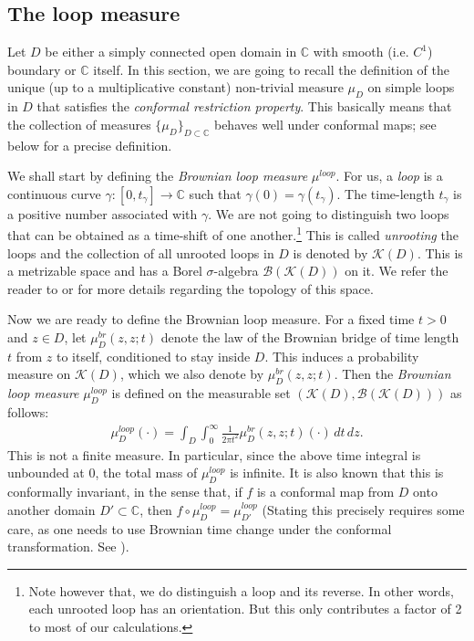 \documentclass[a4paper, 11pt, reqno]{amsart}
\theoremstyle{definition} \newtheorem{defn}{Definition}[section]
\theoremstyle{remark} \newtheorem{rem}[defn]{Remark}
\theoremstyle{remark} \newtheorem*{rem*}{Remark}
\theoremstyle{plain} \newtheorem{thm}[defn]{Theorem}
\theoremstyle{plain} \newtheorem{lem}[defn]{Lemma}
\theoremstyle{plain} \newtheorem{prop}[defn]{Proposition}
\theoremstyle{plain} \newtheorem{cor}[defn]{Corollary}
\theoremstyle{remark} \newtheorem{exm}[defn]{\textbf{Example}}
\theoremstyle{remark} \newtheorem{exms}[defn]{\textbf{Examples}}
\theoremstyle{remark} \newtheorem*{bl}{}
\numberwithin{equation}{section} %
\newcommand{\mc}{\mathcal}
\newcommand{\C}{\mathbb{C}}
\begin{document}
	\subsection{The loop measure}\label{sec:prelim_loop_measure}

    Let $D$ be either a simply connected open domain in $\C$ with smooth (i.e. $C^1$) boundary or $\C$ itself. In this section, we are going to recall the definition of the unique (up to a multiplicative constant) non-trivial measure $\mu_D$ on simple loops in $D$ that satisfies the \textit{conformal restriction property}. This basically means that the collection of measures $\{\mu_D\}_{D\subset \C}$ behaves well under conformal maps; see below for a precise definition.
    
    We shall start by defining the \textit{Brownian loop measure} $\mu^{loop}$. For us, a \textit{loop} is a continuous curve $\gamma : [0, t_{\gamma}] \to \C$ such that $\gamma(0) = \gamma(t_{\gamma})$. The time-length $t_{\gamma}$ is a positive number associated with $\gamma$. We are not going to distinguish two loops that can be obtained as a time-shift of one another.\footnote{Note however that, we do distinguish a loop and its reverse. In other words, each unrooted loop has an orientation. But this only contributes a factor of 2 to most of our calculations.} This is called \textit{unrooting} the loops and the collection of all unrooted loops in $D$ is denoted by $\mc{K}(D)$. This is a metrizable space and has a Borel $\sigma$-algebra $\mc{B}(\mc{K}(D))$ on it. We refer the reader to \cite[Chapter 5]{lawler05} or \cite{lw04} for more details regarding the topology of this space.
    	
	Now we are ready to define the Brownian loop measure. For a fixed time $t >0$ and $z \in D$, let $\mu^{br}_D(z,z;t)$ denote the law of the Brownian bridge of time length $t$ from $z$ to itself, conditioned to stay inside $D$. This induces a probability measure on $\mc{K}(D)$, which we also denote by $\mu^{br}_D(z,z;t)$. Then the \textit{Brownian loop measure} $\mu^{loop}_D$ is defined on the measurable set $(\mc{K}(D), \mc{B}(\mc{K}(D)))$ as follows:
	\begin{align}\label{eq:loop_measure}
		\mu^{loop}_D(\cdot) = \int_{D} \int_0^{\infty} \frac{1}{2\pi t^2} \mu^{br}_D(z,z;t)(\cdot) \, dt \, dz. 
	\end{align}
    This is not a finite measure. In particular, since the above time integral is unbounded at $0$, the total mass of $\mu^{loop}_D$ is infinite. It is also known that this is conformally invariant, in the sense that, if $f$ is a conformal map from $D$ onto another domain $D'\subset \C$, then $f\circ\mu^{loop}_D = \mu^{loop}_{D'}$ (Stating this precisely requires some care, as one needs to use Brownian time change under the conformal transformation. See \cite[Proposition 6]{lw04}). 
	
\end{document}
